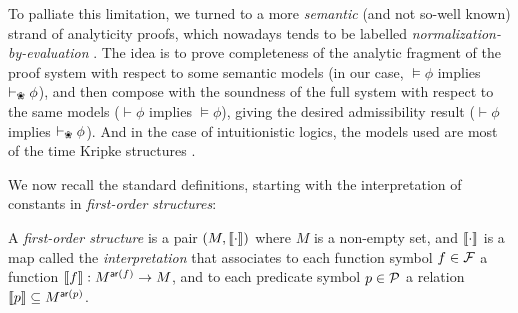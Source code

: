 \begin{itemize}
    To palliate this limitation, we turned to a more \emph{semantic} (and not
    so-well known) strand of analyticity proofs, which nowadays tends to be
    labelled \emph{normalization-by-evaluation} . The idea is to
    prove completeness of the analytic fragment of the proof system with respect
    to some semantic models (in our case, $\vDash \phi$ implies
    $\vdash_{\Nature} \phi$), and then compose with the soundness of the full
    system with respect to the same models ($\vdash \phi$ implies $\vDash
    \phi$), giving the desired admissibility result ($\vdash \phi$ implies
    $\vdash_{\Nature} \phi$). And in the case of intuitionistic logics, the
    models used are most of the time Kripke structures
    .
    
\end{itemize}

We now recall the standard definitions, starting with the interpretation of
constants in \emph{first-order structures}:

\begin{definition}
  A \emph{first-order structure} is a pair $( M, \llbracket \cdot \rrbracket )$
  where $M$ is a non-empty set, and $\llbracket \cdot \rrbracket$ is a map called the
  \emph{interpretation} that associates to each function symbol $f \in \mathcal{F}$
  a function $\llbracket f \rrbracket : M^{\mathsf{ar}(f)} \to M$, and to each predicate symbol $p
  \in \mathcal{P}$ a relation $\llbracket p \rrbracket \subseteq M^{\mathsf{ar}(p)}$.
\end{definition}

